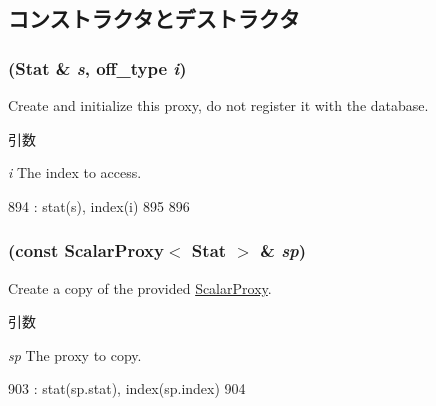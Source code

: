 \subsection{コンストラクタとデストラクタ}
\hypertarget{classStats_1_1ScalarProxy_a2b211b34e1e3c1883bd14ca11e72f217}{
\subsubsection[{ScalarProxy}]{ (Stat \& {\em s}, \/  {\bf off\_\-type} {\em i})}}
\label{classStats_1_1ScalarProxy_a2b211b34e1e3c1883bd14ca11e72f217}
Create and initialize this proxy, do not register it with the database. 
\begin{DoxyParams}{引数}
\item[{\em i}]The index to access. \end{DoxyParams}



\begin{DoxyCode}
894         : stat(s), index(i)
895     {
896     }
\end{DoxyCode}
\hypertarget{classStats_1_1ScalarProxy_ad62084154498044522282f977bcfa1c8}{
\subsubsection[{ScalarProxy}]{ (const {\bf ScalarProxy}$<$ Stat $>$ \& {\em sp})}}
\label{classStats_1_1ScalarProxy_ad62084154498044522282f977bcfa1c8}
Create a copy of the provided \hyperlink{classStats_1_1ScalarProxy}{ScalarProxy}. 
\begin{DoxyParams}{引数}
\item[{\em sp}]The proxy to copy. \end{DoxyParams}



\begin{DoxyCode}
903         : stat(sp.stat), index(sp.index)
904     {}
\end{DoxyCode}


